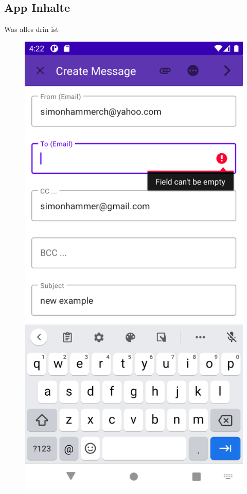 \documentclass[aspectratio=169]{beamer}
\begin{document}
\subsection{App Inhalte}
\begin{frame}[plain]{Was alles drin ist}
    \centering
    \begin{figure}[h]
        \includegraphics[height=.9\textheight]{media/errorMessage.png}

\end{figure}
\end{frame}
\end{document}

